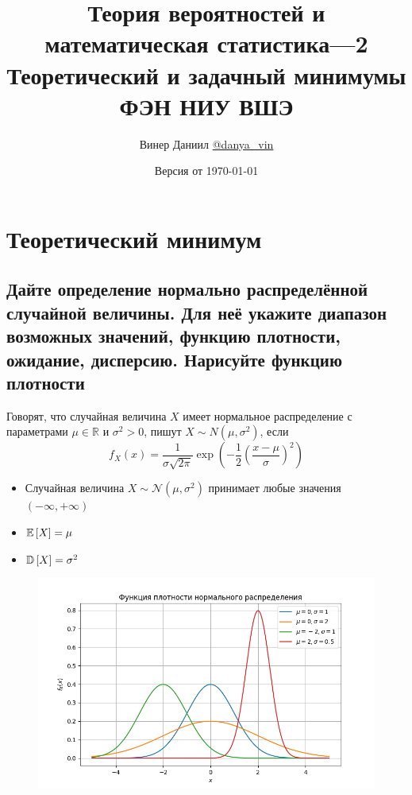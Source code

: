 \documentclass{article}
\title{\LARGE{Теория вероятностей и математическая статистика—2}\\
Теоретический и задачный минимумы\\
ФЭН НИУ ВШЭ}
\author{Винер Даниил  \href{https://t.me/danya_vin}{@danya\_vin}}
\date{Версия от \today}
\begin{document}
\maketitle
\tableofcontents
\newpage
\setlength{\parindent}{15pt}
\setlength{\parskip}{2mm}
\section{Теоретический минимум}

\subsection{Дайте определение нормально распределённой случайной величины. Для неё укажите диапазон возможных значений, функцию плотности, ожидание, дисперсию. Нарисуйте функцию плотности}
 Говорят, что случайная величина $X$ имеет нормальное распределение с параметрами $\mu\in\mathbb{R}$ и $\sigma^2>0$, пишут $X\sim N(\mu,\sigma^2)$, если
\begin{equation*}
    f_X(x)=\frac{1}{\sigma\sqrt{2\pi}}\exp\left(-\frac{1}{2}\left(\frac{x-\mu}{\sigma}\right)^2\right)
\end{equation*}
\begin{itemize}
    \item Случайная величина $X\sim\mathcal{N}(\mu,\sigma^2)$ принимает любые значения $(-\infty,+\infty)$
    \item $\mathbb{E}\left[X\right]=\mu$
    \item $\mathbb{D}\left[X\right]=\sigma^2$
\end{itemize}
\begin{figure}[h]
    \centering
    \includegraphics[width=0.8\linewidth]{normal.png}
\end{figure}
\end{document}
